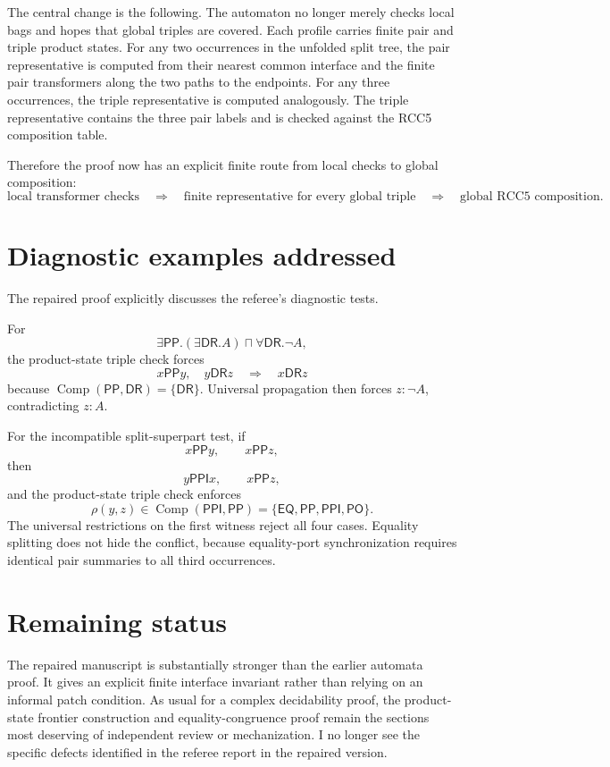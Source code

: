 \documentclass[11pt]{article}
\newcommand{\EQ}{\mathsf{EQ}}
\newcommand{\PP}{\mathsf{PP}}
\newcommand{\PPI}{\mathsf{PPI}}
\newcommand{\PO}{\mathsf{PO}}
\newcommand{\DR}{\mathsf{DR}}
\newcommand{\Comp}{\operatorname{Comp}}
\begin{document}
The central change is the following.  The automaton no longer merely checks local bags and hopes that global triples are covered.  Each profile carries finite pair and triple product states.  For any two occurrences in the unfolded split tree, the pair representative is computed from their nearest common interface and the finite pair transformers along the two paths to the endpoints.  For any three occurrences, the triple representative is computed analogously.  The triple representative contains the three pair labels and is checked against the RCC5 composition table.

Therefore the proof now has an explicit finite route from local checks to global composition:
\[
\text{local transformer checks}
\quad\Longrightarrow\quad
\text{finite representative for every global triple}
\quad\Longrightarrow\quad
\text{global RCC5 composition}.
\]

\section*{Diagnostic examples addressed}

The repaired proof explicitly discusses the referee's diagnostic tests.

For
\[
  \exists\PP.(\exists\DR.A)\sqcap\forall\DR.\neg A,
\]
the product-state triple check forces
\[
  x\PP y,\quad y\DR z
  \quad\Longrightarrow\quad
  x\DR z
\]
because $\Comp(\PP,\DR)=\{\DR\}$.  Universal propagation then forces $z:\neg A$, contradicting $z:A$.

For the incompatible split-superpart test, if
\[
  x\PP y,
  \qquad
  x\PP z,
\]
then
\[
  y\PPI x,
  \qquad
  x\PP z,
\]
and the product-state triple check enforces
\[
  \rho(y,z)\in\Comp(\PPI,\PP)=\{\EQ,\PP,\PPI,\PO\}.
\]
The universal restrictions on the first witness reject all four cases.  Equality splitting does not hide the conflict, because equality-port synchronization requires identical pair summaries to all third occurrences.

\section*{Remaining status}

The repaired manuscript is substantially stronger than the earlier automata proof.  It gives an explicit finite interface invariant rather than relying on an informal patch condition.  As usual for a complex decidability proof, the product-state frontier construction and equality-congruence proof remain the sections most deserving of independent review or mechanization.  I no longer see the specific defects identified in the referee report in the repaired version.
\end{document}
